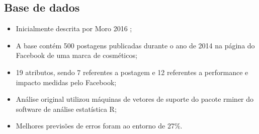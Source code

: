 \subsection{Base de dados}
\begin{frame}
	\begin{itemize}
		\item Inicialmente descrita por Moro 2016 \cite{moro2016};
		\item A base contém 500 postagens publicadas durante o ano de 2014 na página do Facebook de uma marca de cosméticos;
		\item 19 atributos, sendo 7 referentes a postagem e 12 referentes a performance e impacto medidas pelo Facebook;
		\item Análise original utilizou máquinas de vetores de suporte do pacote rminer do software de análise estatística R;
		\item Melhores previsões de erros foram ao entorno de 27\%.
	\end{itemize}
\end{frame}